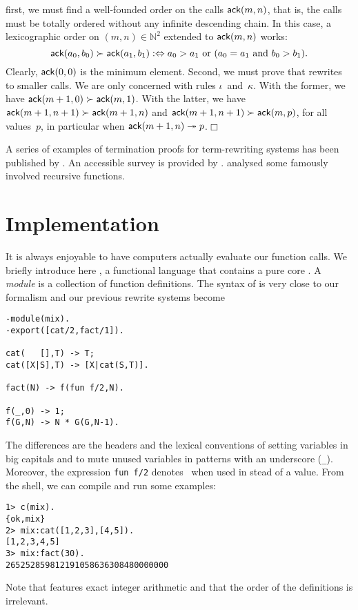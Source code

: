 first, we must find a well\hyp{}founded order on the calls
\(\textsf{ack}(m,n)\), that is, the calls must be totally ordered without
any infinite descending chain. In this case, a lexicographic order on
\((m,n) \in \mathbb{N}^2\) extended to \(\textsf{ack}(m,n)\) works:
\begin{equation*}
\textsf{ack}(a_0,b_0) \succ \textsf{ack}(a_1,b_1) :\Leftrightarrow 
\text{\(a_0 > a_1\) or (\(a_0 = a_1\) and \(b_0 > b_1\)).}
\end{equation*}
Clearly, \(\textsf{ack}(0,0)\) is the minimum element. Second, we must
prove that  rewrites to smaller calls. We are only
concerned with rules \(\iota\)~and~\(\kappa\). With the former, we
have \(\textsf{ack}(m+1,0) \succ \textsf{ack}(m,1)\). With the latter, we
have \(\textsf{ack}(m+1,n+1) \succ \textsf{ack}(m+1,n)\) and
\(\textsf{ack}(m+1,n+1) \succ \textsf{ack}(m,p)\), for all values~\(p\), in
particular when \(\textsf{ack}(m+1,n) \twoheadrightarrow
p\).\hfill\(\Box\)

A series of examples of termination proofs for term\hyp{}rewriting systems has been
published by \cite{Dershowitz_1995,ArtsGiesl_2001}. An accessible
survey is provided by \cite{Dershowitz_1987}. \cite{Knuth_2000a}
analysed some famously involved recursive functions.

\section{Implementation}
\label{sec:implementation}


It is always enjoyable to have computers actually evaluate our
function calls. We briefly introduce here \Erlang, a functional
language that contains a pure core \citep{Armstrong_2007}. A
\emph{module} is a collection of function definitions. The syntax of
\Erlang is very close to our formalism and our previous rewrite
systems become
\begin{verbatim}
-module(mix).
-export([cat/2,fact/1]).

cat(   [],T) -> T;
cat([X|S],T) -> [X|cat(S,T)].

fact(N) -> f(fun f/2,N).

f(_,0) -> 1;
f(G,N) -> N * G(G,N-1).
\end{verbatim}
The differences are the headers and the lexical conventions of setting
variables in big capitals and to mute unused variables in patterns
with an underscore (\verb|_|). Moreover, the expression \verb|fun f/2|
denotes~ when used in stead of a value. From the \Erlang
shell, we can compile and run some examples:
\begin{verbatim}
1> c(mix).
{ok,mix}
2> mix:cat([1,2,3],[4,5]).
[1,2,3,4,5]
3> mix:fact(30).
265252859812191058636308480000000
\end{verbatim}
Note that \Erlang features exact integer arithmetic and that the order
of the definitions is irrelevant.


